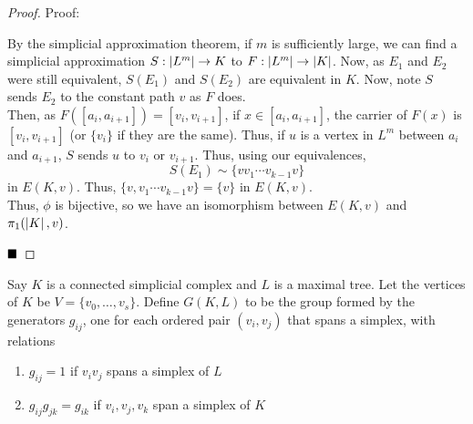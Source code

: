 \begin{proof}{Proof:}
    
    By the simplicial approximation theorem, if $m$ is sufficiently large, we can find a simplicial approximation $S : \left\lvert {L^m} \right\rvert \to K$ to $F : \left\lvert {L^m} \right\rvert \to \left\lvert {K} \right\rvert$. Now, as $E_1$ and $E_2$ were still equivalent, $S(E_1)$ and $S(E_2)$ are equivalent in $K$. Now, note $S$ sends $E_2$ to the constant path $v$ as $F$ does.\\

    
    Then, as $F([a_i, a_{i + 1}]) = [v_i, v_{i + 1}]$, if $x \in [a_i, a_{i + 1}]$, the carrier of $F(x)$ is $[v_i, v_{i + 1}]$ (or $\{v_i\}$ if they are the same). Thus, if $u$ is a vertex in $L^m$ between $a_i$ and $a_{i + 1}$, $S$ sends $u$ to $v_i$ or $v_{i + 1}$. Thus, using our equivalences,
    \[ S(E_1) \sim \{v v_1 \cdots v_{k - 1} v\} \]
    in $E(K, v)$. Thus, $\{v, v_1 \cdots v_{k - 1} v\} = \{v\}$ in $E(K, v)$.\\

    Thus, $\phi$ is bijective, so we have an isomorphism between $E(K, v)$ and $\pi_1(\left\lvert {K} \right\rvert, v)$.

    $\qed$
\end{proof}

\begin{definition}
    Say $K$ is a connected simplicial complex and $L$ is a maximal tree. Let the vertices of $K$ be $V = \{v_0, \ldots, v_s\}$. Define $G(K, L)$ to be the group formed by the generators $g_{ij}$, one for each ordered pair $(v_i, v_j)$ that spans a simplex, with relations
    \begin{enumerate}[label = (\alph*)]
        \item $g_{ij} = 1$ if $v_i v_j$ spans a simplex of $L$
        \item $g_{ij}g_{jk} = g_{ik}$ if $v_i, v_j, v_k$ span a simplex of $K$
    \end{enumerate}
\end{definition}
